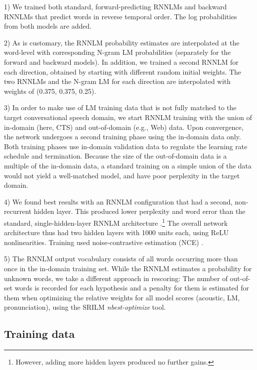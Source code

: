 \documentclass{article}
\begin{document}
1)
	We trained both standard, forward-predicting RNNLMs and backward RNNLMs that predict words
	in reverse temporal order.
	The log probabilities from both models are added.


2)
	As is customary, the RNNLM probability estimates are interpolated at the word-level with
	corresponding N-gram LM probabilities (separately for the forward and backward models).
	In addition, we trained a second RNNLM for each direction, obtained by starting with different random 
	initial weights.
	The two RNNLMs and the N-gram LM for each direction are interpolated with weights of (0.375, 0.375, 0.25).


3)
	In order to make use of LM training data that is not fully matched to the target conversational speech domain,
	we start RNNLM training with the union of in-domain (here, CTS) and out-of-domain (e.g., Web) data.
	Upon convergence, the
	network undergoes a second training phase using the in-domain data only. Both training phases use in-domain
	validation data to regulate the learning rate schedule and termination.
	Because the size of the out-of-domain data is a multiple of the in-domain data, a standard training
	on a simple union of the data
	would not yield a well-matched model, and have poor perplexity in the target domain.


4)
	We found best results with an RNNLM configuration that had a second, non-recurrent hidden layer.
	This produced lower perplexity and word error than the standard, single-hidden-layer RNNLM architecture
	\cite{mikolov2010recurrent}.\footnote{However, adding more hidden layers produced no further gains.}
	The overall network architecture thus had two hidden layers with 1000 units each, using ReLU nonlinearities.
	Training used noise-contrastive estimation (NCE) \cite{Gutmann:NCE}.


5)
	The RNNLM output vocabulary consists of all words occurring more than once in the in-domain training set.
	While the RNNLM estimates a probability for unknown words, we take a different approach in rescoring:
 	The number of out-of-set words is recorded for each hypothesis and a penalty for them is estimated for them
	when optimizing the relative weights for all model scores (acoustic, LM, pronunciation),
	using the SRILM {\em nbest-optimize} tool.


\subsection{Training data}
\end{document}
